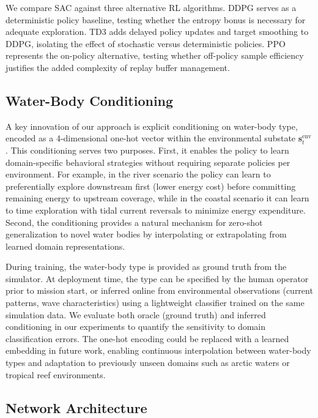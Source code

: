 \documentclass[conference]{IEEEtran}
\begin{document}
We compare SAC against three alternative RL algorithms. DDPG \cite{Lillicrap2016DDPG} serves as a deterministic policy baseline, testing whether the entropy bonus is necessary for adequate exploration. TD3 \cite{Fujimoto2018TD3} adds delayed policy updates and target smoothing to DDPG, isolating the effect of stochastic versus deterministic policies. PPO \cite{Schulman2017PPO} represents the on-policy alternative, testing whether off-policy sample efficiency justifies the added complexity of replay buffer management.


\subsection{Water-Body Conditioning}

A key innovation of our approach is explicit conditioning on water-body type, encoded as a 4-dimensional one-hot vector within the environmental substate $\boldsymbol{s}_t^{\text{env}}$. This conditioning serves two purposes. First, it enables the policy to learn domain-specific behavioral strategies without requiring separate policies per environment. For example, in the river scenario the policy can learn to preferentially explore downstream first (lower energy cost) before committing remaining energy to upstream coverage, while in the coastal scenario it can learn to time exploration with tidal current reversals to minimize energy expenditure. Second, the conditioning provides a natural mechanism for zero-shot generalization to novel water bodies by interpolating or extrapolating from learned domain representations.

During training, the water-body type is provided as ground truth from the simulator. At deployment time, the type can be specified by the human operator prior to mission start, or inferred online from environmental observations (current patterns, wave characteristics) using a lightweight classifier trained on the same simulation data. We evaluate both oracle (ground truth) and inferred conditioning in our experiments to quantify the sensitivity to domain classification errors. The one-hot encoding could be replaced with a learned embedding in future work, enabling continuous interpolation between water-body types and adaptation to previously unseen domains such as arctic waters or tropical reef environments.


\subsection{Network Architecture}
\end{document}
